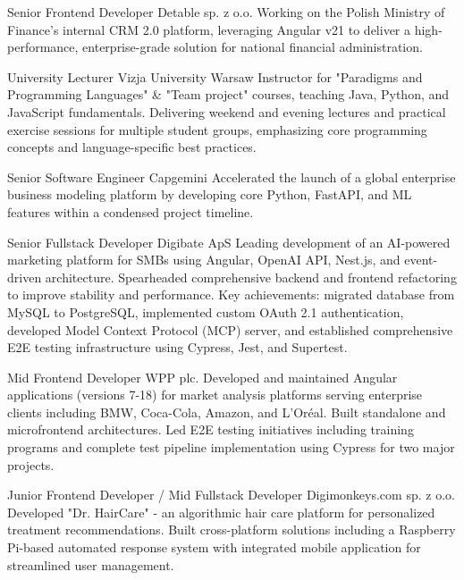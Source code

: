 \documentclass[9pt]{developercv}%
\begin{document}

	\begin{entrylist}
		 {Senior Frontend Developer} {Detable sp. z o.o.} {Working on the Polish Ministry of Finance's internal CRM 2.0 platform, leveraging Angular v21 to deliver a high-performance, enterprise-grade solution for national financial administration.}

		 {University Lecturer} {Vizja University Warsaw} {Instructor for "Paradigms and Programming Languages" \& "Team project" courses, teaching Java, Python, and JavaScript fundamentals. Delivering weekend and evening lectures and practical exercise sessions for multiple student groups, emphasizing core programming concepts and language-specific best practices.}

		 {Senior Software Engineer} {Capgemini} {Accelerated the launch of a global enterprise business modeling platform by developing core Python, FastAPI, and ML features within a condensed project timeline.}

		 {Senior Fullstack Developer} {Digibate ApS} {Leading development of an AI-powered marketing platform for SMBs using Angular, OpenAI API, Nest.js, and event-driven architecture. Spearheaded comprehensive backend and frontend refactoring to improve stability and performance. Key achievements: migrated database from MySQL to PostgreSQL, implemented custom OAuth 2.1 authentication, developed Model Context Protocol (MCP) server, and established comprehensive E2E testing infrastructure using Cypress, Jest, and Supertest.}

		 {Mid Frontend Developer} {WPP plc.} {Developed and maintained Angular applications (versions 7-18) for market analysis platforms serving enterprise clients including BMW, Coca-Cola, Amazon, and L'Oréal. Built standalone and microfrontend architectures. Led E2E testing initiatives including training programs and complete test pipeline implementation using Cypress for two major projects.}

		 {Junior Frontend Developer / Mid Fullstack Developer}
		{Digimonkeys.com sp. z o.o.} {Developed "Dr. HairCare" - an algorithmic hair care platform for personalized treatment recommendations. Built cross-platform solutions including a Raspberry Pi-based automated response system with integrated mobile application for streamlined user management.}


\end{entrylist}
\end{document}
